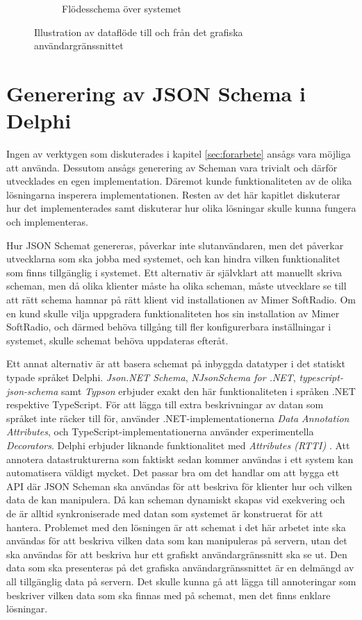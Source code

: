 \begin{figure}
\begin{subfigure}{0.5\textwidth}
		\caption{Flödesschema över systemet}
		\label{fig:system:upp}	
	\end{subfigure}
	\caption{Illustration av dataflöde till och från det grafiska användargränssnittet}
	\label{fig:system}
\end{figure}

\section{Generering av JSON Schema i Delphi}

Ingen av verktygen som diskuterades i kapitel \ref{sec:forarbete} ansågs vara möjliga att använda. Dessutom ansågs generering av Scheman vara trivialt och därför utvecklades en egen implementation. Däremot kunde funktionaliteten av de olika lösningarna insperera implementationen. Resten av det här kapitlet diskuterar hur det implementerades samt diskuterar hur olika lösningar skulle kunna fungera och implementeras.

Hur JSON Schemat genereras, påverkar inte slutanvändaren, men det påverkar utvecklarna som ska jobba med systemet, och kan hindra vilken funktionalitet som finns tillgänglig i systemet. Ett alternativ är självklart att manuellt skriva scheman, men då olika klienter måste ha olika scheman, måste utvecklare se till att rätt schema hamnar på rätt klient vid installationen av Mimer SoftRadio. Om en kund skulle vilja uppgradera funktionaliteten hos sin installation av Mimer SoftRadio, och därmed behöva tillgång till fler konfigurerbara inställningar i systemet, skulle schemat behöva uppdateras efteråt.

Ett annat alternativ är att basera schemat på inbyggda datatyper i det statiskt typade språket Delphi. \textit{Json.NET Schema}, \textit{NJsonSchema for .NET}, \textit{typescript-json-schema} samt \textit{Typson} erbjuder exakt den här funktionaliteten i språken .NET respektive TypeScript. För att lägga till extra beskrivningar av datan som språket inte räcker till för, använder .NET-implementationerna \textit{Data Annotation Attributes}, och TypeScript-implementationerna använder experimentella \textit{Decorators}. \cite{Suter,Newtonsoft,El-Dardiry,Bovet} Delphi erbjuder liknande funktionalitet med \textit{Attributes (RTTI)} \cite{Embarcadero2016}. Att annotera datastrukturerna som faktiskt sedan kommer användas i ett system kan automatisera väldigt mycket. Det passar bra om det handlar om att bygga ett API där JSON Scheman ska användas för att beskriva för klienter hur och vilken data de kan manipulera. Då kan scheman dynamiskt skapas vid exekvering och de är alltid synkroniserade med datan som systemet är konstruerat för att hantera. Problemet med den lösningen är att schemat i det här arbetet inte ska användas för att beskriva vilken data som kan manipuleras på servern, utan det ska användas för att beskriva hur ett grafiskt användargränssnitt ska se ut. Den data som ska presenteras på det grafiska användargränssnittet är en delmängd av all tillgänglig data på servern. Det skulle kunna gå att lägga till annoteringar som beskriver vilken data som ska finnas med på schemat, men det finns enklare lösningar.

